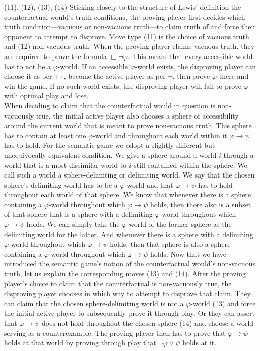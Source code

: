 \documentclass[a4paper,american]{paper}
\theoremstyle{definition}\newtheorem{definition}{Definition}
\begin{document}
\indent (11), (12), (13), (14) Sticking closely to the structure of Lewis' definition the counterfactual would's truth conditions, the proving player first decides which truth condition---vacuous or non-vacuous truth---to claim truth of and force their opponent to attempt to disprove. Move type (11) is the choice of vacuous truth and (12) non-vacuous truth. When the proving player claims vacuous truth, they are required to prove the formula $\Box\neg\varphi$. This means that every accessible world has to not be a $\varphi$-world. If an accessible $\varphi$-world exists, the disproving player can choose it as per $\Box$, become the active player as per $\neg$, then prove $\varphi$ there and win the game. If no such world exists, the disproving player will fail to prove $\varphi$ with optimal play and lose.\\
\indent When deciding to claim that the counterfactual would in question is non-vacuously true, the initial active player also chooses a sphere of accessibility around the current world that is meant to prove non-vacuous truth. This sphere has to contain at least one $\varphi$-world and throughout each world within it $\varphi\rightarrow\psi$ has to hold. For the semantic game we adopt a slightly different but unequivocally equivalent condition. We give a sphere around a world $i$ through a world that is a most dissimilar world to $i$ still contained within the sphere. We call such a world a sphere-delimiting or delimiting world. We say that the chosen sphere's delimiting world has to be a $\varphi$-world and that $\varphi\rightarrow\psi$ has to hold throughout each world of that sphere. We know that whenever there is a sphere containing a $\varphi$-world throughout which $\varphi\rightarrow\psi$ holds, then there also is a subset of that sphere that is a sphere with a delimiting $\varphi$-world throughout which $\varphi\rightarrow\psi$ holds. We can simply take the $\varphi$-world of the former sphere as the delimiting world for the latter. And whenever there is a sphere with a delimiting $\varphi$-world throughout which $\varphi\rightarrow\psi$ holds, then that sphere is also a sphere containing a $\varphi$-world throughout which $\varphi\rightarrow\psi$ holds. Now that we have introduced the semantic game's notion of the counterfactual would's non-vacuous truth, let us explain the corresponding moves (13) and (14). After the proving player's choice to claim that the counterfactual is non-vacuously true, the disproving player chooses in which way to attempt to disprove that claim. They can claim that the chosen sphere-delimiting world is not a $\varphi$-world (13) and force the initial active player to subsequently prove it through play. Or they can assert that $\varphi\rightarrow\psi$ does not hold throughout the chosen sphere (14) and choose a world serving as a counterexample. The proving player then has to prove that $\varphi\rightarrow\psi$ holds at that world by proving through play that $\neg\varphi\vee\psi$ holds at it.\\
\end{document}
